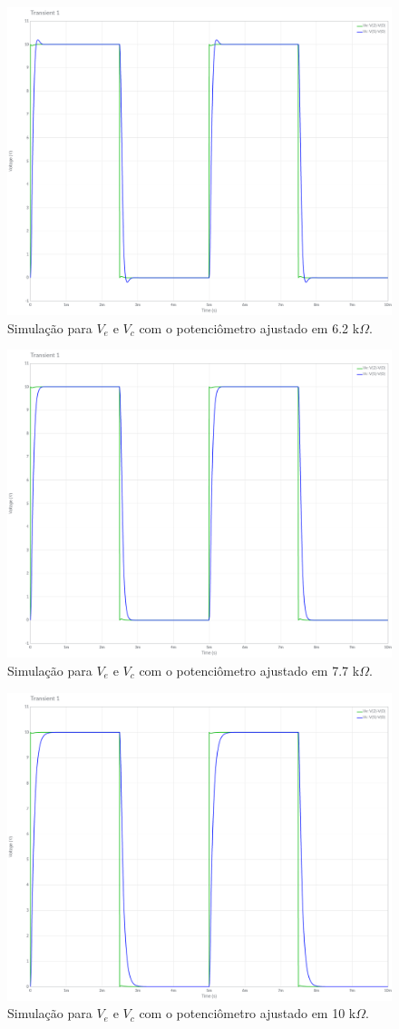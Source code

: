 \documentclass[11pt]{article}
\begin{document}
\begin{figure}[h!]
  \centering
  \includegraphics[width=.6\textwidth]{fig/1a-3}
  \caption{Simulação para $V_{e}$ e $V_{c}$ com o potenciômetro ajustado em 6.2 k$\Omega$.}
  \label{fig:1a-3}
\end{figure}

\begin{figure}[h!]
  \centering
  \includegraphics[width=.6\textwidth]{fig/1a-4}
  \caption{Simulação para $V_{e}$ e $V_{c}$ com o potenciômetro ajustado em 7.7 k$\Omega$.}
  \label{fig:1a-4}
\end{figure}

\begin{figure}[h!]
  \centering
  \includegraphics[width=.6\textwidth]{fig/1a-5}
  \caption{Simulação para $V_{e}$ e $V_{c}$ com o potenciômetro ajustado em 10 k$\Omega$.}
  \label{fig:1a-5}
\end{figure}
\end{document}
